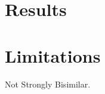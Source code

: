 \documentclass[../hons_project.tex]{subfiles}
\begin{document}
\section{Results}
\section{Limitations}
Not Strongly Bisimilar.
    
\end{document}
